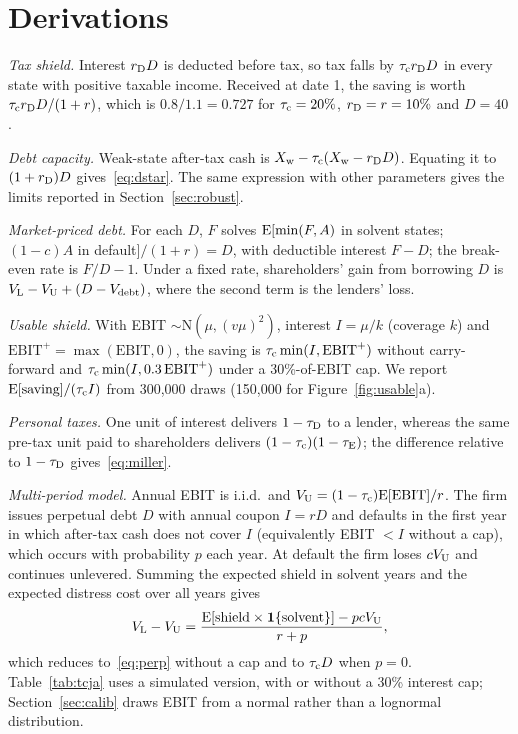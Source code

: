 \section{Derivations}\label{app:B}

\textit{Tax shield.} Interest $r_{\mathrm{D}} D$ is deducted before tax, so tax falls by $\tau_{\mathrm{c}} r_{\mathrm{D}} D$ in every state with positive taxable income. Received at date 1, the saving is worth $\tau_{\mathrm{c}} r_{\mathrm{D}} D/(1 + r)$, which is $0.8/1.1 = 0.727$ for $\tau_{\mathrm{c}} = 20\%$, $r_{\mathrm{D}} = r = 10\%$ and $D = 40$.

\textit{Debt capacity.} Weak-state after-tax cash is $X_{\mathrm{w}} - \tau_{\mathrm{c}}(X_{\mathrm{w}} - r_{\mathrm{D}} D)$. Equating it to $(1 + r_{\mathrm{D}})D$ gives~\eqref{eq:dstar}. The same expression with other parameters gives the limits reported in Section~\ref{sec:robust}.

\textit{Market-priced debt.} For each $D$, $F$ solves $\mathrm{E}[\min(F, A)$ in solvent states; $(1 - c)A$ in default$]/(1 + r) = D$, with deductible interest $F - D$; the break-even rate is $F/D - 1$. Under a fixed rate, shareholders' gain from borrowing $D$ is $V_{\mathrm{L}} - V_{\mathrm{U}} + (D - V_{\mathrm{debt}})$, where the second term is the lenders' loss.

\textit{Usable shield.} With EBIT $\sim \mathrm{N}(\mu, (v\mu)^2)$, interest $I = \mu/k$ (coverage $k$) and $\mathrm{EBIT}^{+} = \max(\mathrm{EBIT}, 0)$, the saving is $\tau_{\mathrm{c}} \min(I, \mathrm{EBIT}^{+})$ without carry-forward and $\tau_{\mathrm{c}} \min(I, 0.3\,\mathrm{EBIT}^{+})$ under a 30\%-of-EBIT cap. We report $\mathrm{E}[\text{saving}]/(\tau_{\mathrm{c}} I)$ from 300,000 draws (150,000 for Figure~\ref{fig:usable}a).

\textit{Personal taxes.} One unit of interest delivers $1 - \tau_{\mathrm{D}}$ to a lender, whereas the same pre-tax unit paid to shareholders delivers $(1 - \tau_{\mathrm{c}})(1 - \tau_{\mathrm{E}})$; the difference relative to $1 - \tau_{\mathrm{D}}$ gives~\eqref{eq:miller}.

\textit{Multi-period model.} Annual EBIT is i.i.d.\ and $V_{\mathrm{U}} = (1 - \tau_{\mathrm{c}})\mathrm{E}[\mathrm{EBIT}]/r$. The firm issues perpetual debt $D$ with annual coupon $I = rD$ and defaults in the first year in which after-tax cash does not cover $I$ (equivalently EBIT $< I$ without a cap), which occurs with probability $p$ each year. At default the firm loses $cV_{\mathrm{U}}$ and continues unlevered. Summing the expected shield in solvent years and the expected distress cost over all years gives
\begin{equation}
  V_{\mathrm{L}} - V_{\mathrm{U}} = \frac{\mathrm{E}[\text{shield} \times \mathbf{1}\{\text{solvent}\}] - pcV_{\mathrm{U}}}{r + p},
  \label{eq:B1}
\end{equation}
which reduces to~\eqref{eq:perp} without a cap and to $\tau_{\mathrm{c}} D$ when $p = 0$. Table~\ref{tab:tcja} uses a simulated version, with or without a 30\% interest cap; Section~\ref{sec:calib} draws EBIT from a normal rather than a lognormal distribution.
